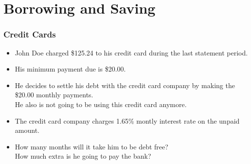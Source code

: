 \documentclass[notheorems
          ]
          {beamer}
\begin{document}
\begin{frame}
\end{frame}


\section{Borrowing and Saving} 



\begin{frame}
 \frametitle { Credit Cards  }
 
 \begin{itemize} [<*>]
  \item John Doe charged \$125.24 to his credit card during the last statement period. 
  \item His minimum payment due is \$20.00. 
  \item He decides to settle his debt with the credit card company by making the \$20.00
  monthly payments. \\
  He also is not going to be using this credit card anymore.
  \item The credit card company charges 1.65\% montly interest rate on the unpaid amount. 
  \item How many months will it take him to be debt free? \\
  How much extra is he going to pay the bank? 
 \end{itemize}

\end{frame}
\end{document}
